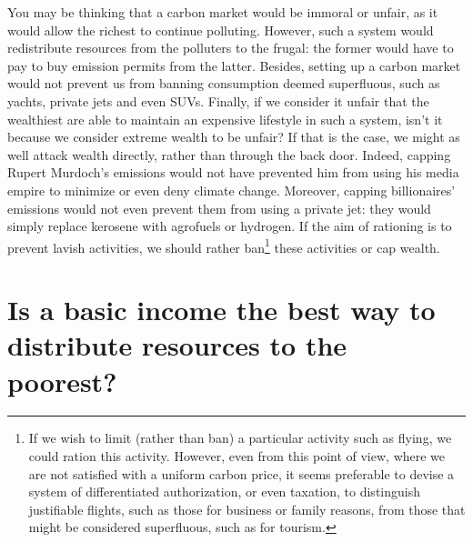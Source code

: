 \documentclass[a5paper,english,openany]{memoir}
\begin{document}
You may be thinking that a carbon market would be immoral or unfair, as it would allow the richest to continue polluting. However, such a system would redistribute resources from the %
polluters to the frugal: the former would have to pay to buy emission permits from the latter. Besides, %
setting up a carbon market would not prevent us from banning consumption deemed superfluous, such as yachts, private jets and even SUVs. %
Finally, if we consider it unfair that the wealthiest are able to maintain an expensive lifestyle in such a system, isn't it because we consider extreme wealth to be unfair? If that is %
the case, we might as well attack wealth directly, rather than through the back door. Indeed, capping Rupert Murdoch's emissions would not have prevented him from using his media empire to minimize %
or even deny climate change. Moreover, capping billionaires' emissions would not even prevent them from using a private jet: they would %
simply replace kerosene with agrofuels or hydrogen. If the aim of rationing is to prevent lavish activities, we should rather ban\footnote{If we wish to limit (rather than ban) a particular activity such as flying, we could ration this activity. However, even from this point of view, where we are not satisfied with a uniform %
carbon price, it seems preferable to devise a system of differentiated authorization, %
or even taxation, %
to distinguish justifiable flights, such as those for business or family reasons, %
from those that might be considered superfluous, such as for tourism.} %
these activities or cap wealth.  %

\section*{\normalsize Is a basic income the best way to distribute resources to the poorest?}\label{q:rdb}
\end{document}
